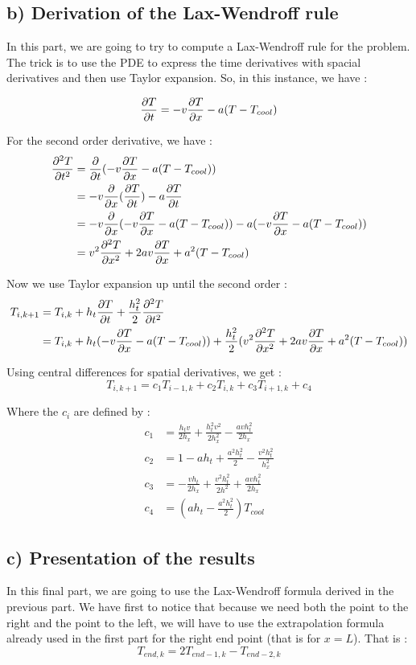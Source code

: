 \subsection*{b) Derivation of the Lax-Wendroff rule}
In this part, we are going to try to compute a Lax-Wendroff rule for the problem. The trick is to use the PDE to express the time derivatives with spacial derivatives and then use Taylor expansion. So, in this instance, we have :

$$\frac{\partial T}{\partial t}=-v\frac{\partial T}{\partial x}-a(T-T_{cool})$$

For the second order derivative, we have :
\begin{align*}
\frac{\partial^2T}{\partial t^2} &= \frac{\partial}{\partial t}( -v\frac{\partial T}{\partial x}-a(T-T_{cool}))\\
&=-v\frac{\partial}{\partial x}(\frac{\partial T}{\partial t})-a\frac{\partial T}{\partial t}\\
&=-v\frac{\partial}{\partial x}(-v\frac{\partial T}{\partial x}-a(T-T_{cool})) - a(-v\frac{\partial T}{\partial x}-a(T-T_{cool}))\\
&=v^2\frac{\partial^2 T}{\partial x^2}+2av\frac{\partial T}{\partial x}+a^2(T-T_{cool})
\end{align*}

Now we use Taylor expansion up until the second order : 
\begin{align*}
T_{i,k+1} &= T_{i,k}+h_t \frac{\partial T}{\partial t}+\frac{h_t^2}{2}\frac{\partial^2 T}{\partial t^2}\\
&=T_{i,k}+h_t(-v\frac{\partial T}{\partial x}-a(T-T_{cool}))+\frac{h_t^2}{2}(v^2\frac{\partial^2 T}{\partial x^2}+2av\frac{\partial T}{\partial x}+a^2(T-T_{cool})) 
\end{align*}

Using central differences for spatial derivatives, we get : 
$$T_{i,k+1} = c_1T_{i-1,k}+c_2T_{i,k}+c_3T_{i+1,k}+c_4$$

Where the $c_i$ are defined by : 
\begin{align*}
c_1 &= \frac{h_tv}{2h_x}+\frac{h_t^2v^2}{2h_x^2}-\frac{avh_t^2}{2h_x}\\
c_2 &=1-ah_t+\frac{a^2h_t^2}{2}-\frac{v^2h_t^2}{h_x^2}\\
c_3 &= -\frac{vh_t}{2h_x}+\frac{v^2h_t^2}{2h^2}+\frac{avh_t^2}{2h_x}\\
c_4 &= (ah_t - \frac{a^2h_t^2}{2})T_{cool}
\end{align*}

\subsection*{c) Presentation of the results}
In this final part, we are going to use the Lax-Wendroff formula derived in the previous part. We have first to notice that because we need both the point to the right and the point to the left, we will have to use the extrapolation formula already used in the first part for the right end point (that is for $x=L$). That is : 
$$T_{end,k} = 2T_{end-1,k}-T_{end-2,k}$$


